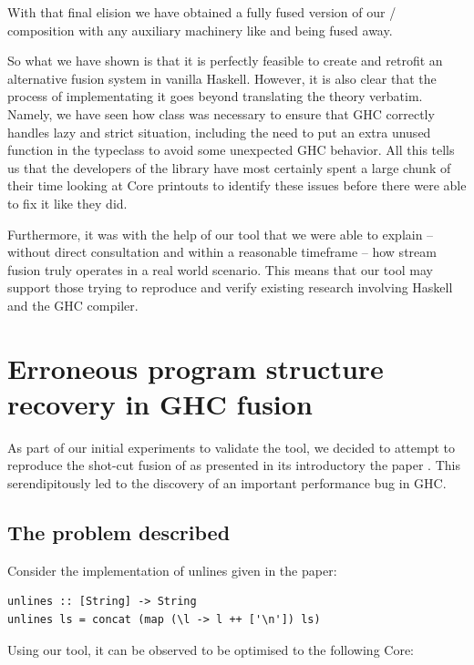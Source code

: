With that final elision we have obtained a fully fused version of our / composition with any auxiliary machinery like  and
 being fused away. 

So what we have shown is that it is perfectly feasible to create and retrofit an alternative fusion system in vanilla Haskell. 
However, it is also clear that the process of implementating it goes beyond translating the theory verbatim. Namely, we have seen how  class was necessary to ensure that
GHC correctly handles lazy and strict situation, including the need to put an extra unused function in the typeclass to avoid some unexpected GHC behavior.
All this tells us that the developers of the library have most certainly spent a large chunk of their time looking at Core printouts to identify these issues before
there were able to fix it like they did. 

Furthermore, it was with the help of our tool that we were able to explain -- without direct consultation and within a reasonable timeframe -- 
how stream fusion truly operates in a real world scenario. This means that our tool may support those trying to reproduce and verify existing research
involving Haskell and the GHC compiler.

\section{Erroneous program structure recovery in GHC fusion}
\label{section:results:unlines}

As part of our initial experiments to validate the tool, we decided to attempt to reproduce the shot-cut fusion of  as presented
in its introductory the paper \cite{shortcut_fusion}. This serendipitously led to the discovery of an important performance bug in GHC.

\subsection{The problem described}
Consider the implementation of unlines given in the paper:

\begin{listing}[H]
\begin{verbatim}
unlines :: [String] -> String
unlines ls = concat (map (\l -> l ++ ['\n']) ls)
\end{verbatim}
\end{listing}

Using our tool, it can be observed to be optimised to the following Core:

